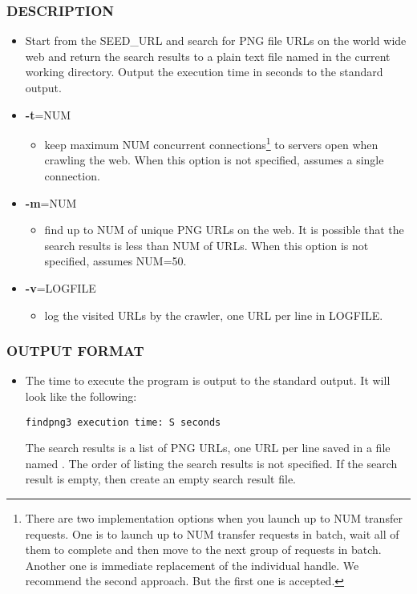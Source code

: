 \subsubsection*{DESCRIPTION}
\begin{itemize}
\item[]Start from the SEED\_URL and search for PNG file URLs on the world wide web and return the search results to a plain text file named  in the current working directory. Output the execution time in seconds to the standard output.
\item[] {\bf -t}=NUM
  \begin{itemize}
  \item[] keep maximum NUM concurrent connections\footnote{There are two implementation options when you launch up to NUM transfer requests. One is to launch up to NUM transfer requests in batch, wait all of them to complete and then move to the next group of requests in batch. Another one is immediate replacement of the individual handle. We recommend the second approach. But the first one is accepted.} to servers open when crawling the web. When this option is not specified, assumes a single connection. 
  \end{itemize}
\item[] {\bf -m}=NUM
  \begin{itemize}
  \item[] find up to NUM of unique PNG URLs on the web. It is possible that the search results is less than NUM of URLs. When this option is not specified, assumes NUM=50. 
  \end{itemize}
\item[] {\bf -v}=LOGFILE
  \begin{itemize}
  \item[] log the visited URLs by the crawler, one URL per line in LOGFILE.
  \end{itemize}
\end{itemize}
\subsubsection*{OUTPUT FORMAT}
\begin{itemize}
\item[]The time to execute the program is output to the standard output. It will look like the following:
\begin{verbatim}
findpng3 execution time: S seconds
\end{verbatim}
  The search results is a list of PNG URLs, one URL per line saved in a file named . The order of listing the search results is not specified. If the search result is empty, then create an empty search result file.
\end{itemize}
